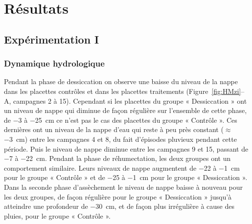\section{Résultats}

\subsection{Expérimentation I}

\subsubsection{Dynamique hydrologique}


Pendant la phase de dessiccation on observe une baisse du niveau de la nappe dans les placettes contrôles et dans les placettes traitements (Figure~\ref{fig:HMzi}--A, campagnes 2 à 15).
Cependant si les placettes du groupe « Dessiccation » ont un niveau de nappe qui diminue de façon régulière sur l'ensemble de cette phase, de \num{-3} à \SI{-25}{\centi\metre} ce n'est pas le cas des placettes du groupe « Contrôle ».
Ces dernières ont un niveau de la nappe d'eau qui reste à peu près constant ($\approx$ \SI{-3}{\centi\metre}) entre les campagnes 4 et 8, du fait d'épisodes pluvieux pendant cette période.
Puis le niveau de nappe diminue entre les campagnes 9 et 15, passant de \num{-7} à \SI{-22}{\centi\metre}.
Pendant la phase de réhumectation, les deux groupes ont un comportement similaire.
Leurs niveaux de nappe augmentent de \num{-22} à \SI{-1}{\centi\metre} pour le groupe « Contrôle » et de \num{-25} à \SI{-1}{\centi\metre} pour le groupe « Dessiccation ».
Dans la seconde phase d'assèchement le niveau de nappe baisse à nouveau pour les deux groupes, de façon régulière pour le groupe « Dessiccation » jusqu'à atteindre une profondeur de \SI{-30}{\centi\metre}, et de façon plus irrégulière à cause des pluies, pour le groupe « Contrôle ».


